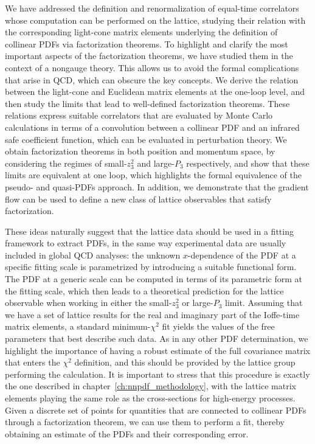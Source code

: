We have addressed the definition and renormalization of equal-time
correlators whose computation can be performed on the lattice, studying their
relation with the corresponding light-cone matrix elements underlying the
definition of collinear PDFs via factorization theorems.
%
To highlight and clarify the most important aspects of the factorization
theorems, we have studied them in the context of a nongauge theory. This allows
us to avoid the formal complications that arise in QCD, which can obscure the key concepts. 
%
We derive the relation between the light-cone and Euclidean matrix
elements at the one-loop level, and then study the limits that lead to well-defined
factorization theorems. These relations express suitable correlators that are evaluated by
Monte Carlo calculations in terms of a convolution between a collinear PDF and an
infrared safe coefficient function, which can be evaluated in perturbation
theory. We obtain factorization theorems in both position and momentum
space, by considering the regimes of small-$z_3^2$ and large-$P_3$ respectively, and
show that these limits are equivalent at one loop, which highlights the formal
equivalence of the pseudo- and quasi-PDFs approach. In addition, we demonstrate that
 the gradient flow can be used to define a new class of lattice observables that satisfy factorization.

These ideas naturally suggest that the lattice data should be used in a fitting framework to extract
PDFs, in the same way experimental data are usually included in global QCD
analyses:
the unknown $x$-dependence of the PDF at a
specific fitting scale is parametrized by introducing a suitable functional
form. The PDF at a generic scale can be computed in terms of its parametric form
at the fitting scale, which then leads to a theoretical prediction for the
lattice observable when working in either the small-$z_3^2$ or large-$P_3$
limit. Assuming that we have a set of lattice results for the real and imaginary
part of the Ioffe-time matrix elements, a standard minimum-$\chi^2$ fit yields
the values of the free parameters that best describe such data. As in any other
PDF determination, we highlight the importance of having a robust estimate of
the full covariance matrix that enters the $\chi^2$ definition, and this should
be provided by the lattice group performing the calculation.
It is important to stress that this procedure is exactly the one
described in chapter~\ref{ch:nnpdf_methodology}, with the lattice matrix
elements playing the same role as the cross-sections for high-energy processes.
Given a discrete set of points for quantities that are connected to collinear
PDFs through a factorization theorem, we can use them to perform a fit, thereby
obtaining an estimate of the PDFs and their corresponding error.
  
